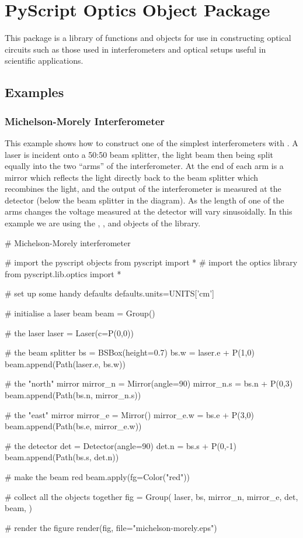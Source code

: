 
\chapter{PyScript Optics Object Package}

This package is a library of functions and objects for use in constructing
optical circuits such as those used in interferometers and optical setups
useful in scientific applications.

\section{Examples}

\subsection{Michelson-Morely Interferometer}

This example shows how to construct one of the simplest interferometers with
\pyscript.  A laser is incident onto a 50:50 beam splitter, the light beam
then being split equally into the two ``arms'' of the interferometer.  At
the end of each arm is a mirror which reflects the light directly back to
the beam splitter which recombines the light, and the output of the
interferometer is measured at the detector (below the beam splitter in the
diagram).  As the length of one of the arms changes the voltage measured at
the detector will vary sinusoidally.  In this example we are using the
, ,  and  objects of the
 library.

\begin{python}
# Michelson-Morely interferometer

# import the pyscript objects
from pyscript import *
# import the optics library
from pyscript.lib.optics import *

# set up some handy defaults
defaults.units=UNITS['cm']

# initialise a laser beam
beam = Group()

# the laser
laser = Laser(c=P(0,0))

# the beam splitter
bs = BSBox(height=0.7)
bs.w = laser.e + P(1,0)
beam.append(Path(laser.e, bs.w))

# the "north" mirror
mirror_n = Mirror(angle=90)
mirror_n.s = bs.n + P(0,3)
beam.append(Path(bs.n, mirror_n.s))

# the "east" mirror
mirror_e = Mirror()
mirror_e.w = bs.e + P(3,0)
beam.append(Path(bs.e, mirror_e.w))

# the detector
det = Detector(angle=90)
det.n = bs.s + P(0,-1)
beam.append(Path(bs.s, det.n))

# make the beam red
beam.apply(fg=Color("red"))

# collect all the objects together
fig = Group(
        laser,
        bs,
        mirror_n, mirror_e,
        det,
        beam,
        )

# render the figure
render(fig,
        file="michelson-morely.eps")
\end{python}

